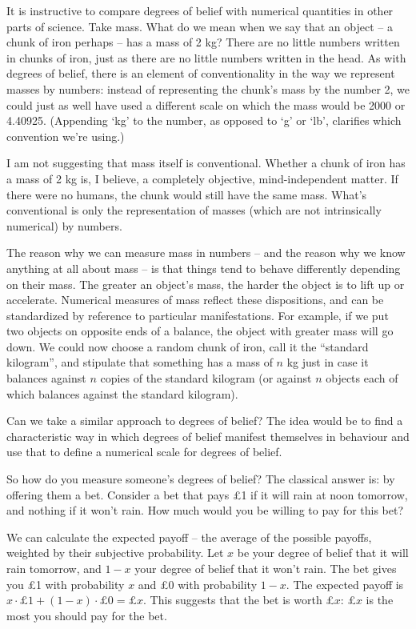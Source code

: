 It is instructive to compare degrees of belief with numerical quantities in
other parts of science. Take mass. What do we mean when we say that an object --
a chunk of iron perhaps -- has a mass of 2 kg? There are no little numbers
written in chunks of iron, just as there are no little numbers written in the
head. As with degrees of belief, there is an element of conventionality in the
way we represent masses by numbers: instead of representing the chunk's mass by
the number 2, we could just as well have used a different scale on which the
mass would be 2000 or 4.40925. (Appending `kg' to the number, as opposed to `g'
or `lb', clarifies which convention we're using.)

I am not suggesting that mass itself is conventional. Whether a chunk
of iron has a mass of 2 kg is, I believe, a completely objective, mind-independent
matter. If there were no humans, the chunk would still have the same
mass. What's conventional is only the representation of masses (which
are not intrinsically numerical) by numbers.

The reason why we can measure mass in numbers -- and the reason why we know
anything at all about mass -- is that things tend to behave differently
depending on their mass. The greater an object's mass, the harder the object is
to lift up or accelerate. Numerical measures of mass reflect these dispositions,
and can be standardized by reference to particular manifestations. For example,
if we put two objects on opposite ends of a balance, the object with greater mass
will go down. We could now choose a random chunk of iron, call it the ``standard
kilogram'', and stipulate that something has a mass of $n$ kg just in case it
balances against $n$ copies of the standard kilogram (or against $n$ objects
each of which balances against the standard kilogram).

Can we take a similar approach to degrees of belief? The idea would be to find a
characteristic way in which degrees of belief manifest themselves in behaviour
and use that to define a numerical scale for degrees of belief.

So how do you measure someone's degrees of belief? The classical answer is: by
offering them a bet. Consider a bet that pays £1 if it will rain at noon tomorrow, and
nothing if it won't rain. How much would you be willing to pay for
this bet?

We can calculate the expected payoff -- the average of the possible
payoffs, weighted by their subjective probability. Let $x$ be your degree of
belief that it will rain tomorrow, and $1\!-\!x$ your degree of belief that it won't
rain. The bet gives you £1 with probability $x$ and £0 with probability $1\!-\!x$.
The expected payoff is $x \cdot \text{£1} + (1\!-\!x) \cdot \text{£0} = \text{£}x$.
This suggests that the bet is worth £$x$: £$x$ is the most you should
pay for the bet.


